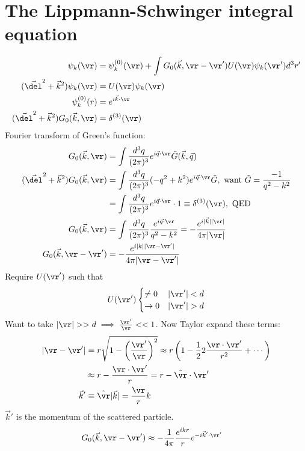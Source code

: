 \documentclass[a4paper, 11pt, normalem]{report}
\begin{document}
\section{The Lippmann-Schwinger integral equation}
\begin{align}
    \psi_k(\vr) &= \psi_k^{(0)}(\vr) + \int G_0(\vec{k},\vr-\vr')U(\vr)\psi_k(\vr')d^3r' \\
    (\vec{\del}^2 + \vec{k}^2)\psi_k(\vr) &= U(\vr)\psi_k(\vr) \\
    \psi_k^{(0)}(r) &= e^{i\vec{k}\cdot\vr} \\
    (\vec{\del}^2 + \vec{k}^2)G_0(\vec{k},\vr) &= \delta^{(3)}(\vr)
\end{align}
Fourier transform of Green's function:
\begin{align}
    G_0(\vec{k},\vr) &= \int \frac{d^3q}{(2\pi)^3} e^{i\vec{q}\cdot\vr} \tilde{G}(\vec{k},\vec{q})\\
    (\vec{\del}^2 + \vec{k}^2)G_0(\vec{k},\vr) &= \int \frac{d^3q}{(2\pi)^3} (-q^2 + k^2)e^{i\vec{q}\cdot\vr}\tilde{G},~ \text{want } \tilde{G} = \frac{-1}{q^2-k^2} \\
                                               &= \int \frac{d^3q}{(2\pi)^3} e^{i\vec{q}\cdot\vr}\cdot 1 \equiv \delta^{(3)}(\vr),\text{ QED} \\
    G_0(\vec{k},\vr) &= \int \frac{d^3q}{(2\pi)^3} \frac{e^{i\vec{q}\cdot\vr}}{q^2-k^2} = -\frac{e^{i|\vec{k}||\vr|}}{4\pi |\vr|} \\
    G_0(\vec{k},\vr-\vr') &= -\frac{e^{i|k||\vr-\vr'|}}{4\pi |\vr-\vr'|}
\end{align}
Require $U(\vr')$ such that
\begin{equation}
    U(\vr') \begin{cases} \neq 0 & |\vr'| < d \\ \to 0 & |\vr'| > d \end{cases}
\end{equation}
Want to take $|\vr| >> d \implies \frac{\vr'}{\vr} << 1$.
Now Taylor expand these terms:
\begin{align}
    |\vr - \vr'| &= r\sqrt{1 - \left(\frac{\vr'}{\vr}\right)^2} \approx r\left(1-\frac12 2\frac{\vr\cdot\vr'}{r^2} + \cdots\right) \\
                 &\approx r - \frac{\vr\cdot\vr'}{r} = r - \hat{\vr}\cdot\vr' \\
    \vec{k}' &\equiv \hat{\vr}|\vec{k}| = \frac{\vr}{r}k
\end{align}
$\vec{k}'$ is the momentum of the scattered particle.
\begin{align}
    G_0(\vec{k},\vr-\vr') &\approx -\frac{1}{4\pi} \frac{e^{ikr}}{r} e^{-i\vec{k}'\cdot\vr'}
\end{align}
\end{document}
